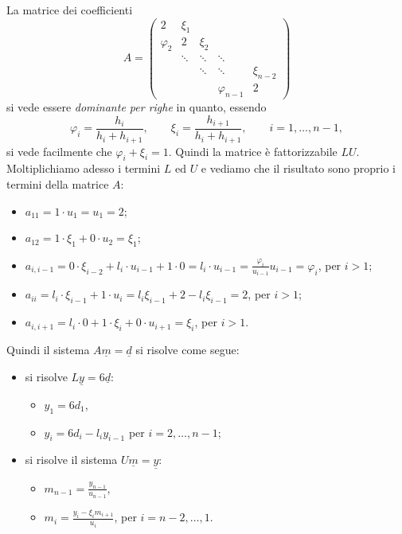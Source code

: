 \begin{sol}
	La matrice dei coefficienti
	\[
		A=\begin{pmatrix}
			2 & \xi_1 & & &\\
			\varphi_2 & 2 & \xi_2 & &\\
			& \ddots & \ddots & \ddots &\\
			& & \ddots & \ddots & \xi_{n-2}\\
			& & & \varphi_{n-1} & 2
		\end{pmatrix}
	\]
	si vede essere \textit{dominante per righe} in quanto, essendo
	$$\varphi_i=\frac{h_i}{h_i+h_{i+1}},\qquad\xi_i=\frac{h_{i+1}}{h_i+h_{i+1}},\qquad i=1,\dots,n-1,$$
	si vede facilmente che $\varphi_i+\xi_i=1$. Quindi la matrice è fattorizzabile $LU$.\\
	Moltiplichiamo adesso i termini $L$ ed $U$ e vediamo che il risultato sono proprio i termini della matrice $A$:
	\begin{itemize}
		\item $a_{11}=1\cdot u_1=u_1=2$;
		\item $a_{12}=1\cdot\xi_1 + 0\cdot u_2=\xi_1$;
		\item $a_{i,i-1}=0\cdot\xi_{i-2}+l_i\cdot u_{i-1}+1\cdot 0=l_i\cdot u_{i-1}=\frac{\varphi_i}{u_{i-1}}u_{i-1}=\varphi_i$, per $i>1$;
		\item $a_{ii}=l_i\cdot\xi_{i-1}+1\cdot u_i=l_i\xi_{i-1}+2-l_i\xi_{i-1}=2$, per $i>1$;
		\item $a_{i,i+1}=l_i\cdot 0+1\cdot\xi_i +0\cdot u_{i+1}=\xi_i$, per $i>1$.
	\end{itemize}
	Quindi il sistema $A\underline{m}=\underline{d}$ si risolve come segue:
	\begin{itemize}
		\item si risolve $L\underline{y}= 6\underline{d}$:
			\begin{itemize}
				\item $y_1=6d_1$,
				\item $y_i=6d_i-l_iy_{i-1}$ per $i=2,\dots,n-1$;
			\end{itemize}
		\item si risolve il sistema $U\underline{m}=\underline{y}$:
			\begin{itemize}
				\item $m_{n-1}=\frac{y_{n-1}}{u_{n-1}}$,
				\item $m_{i}=\frac{y_i-\xi_i m_{i+1}}{u_i}$, per $i=n-2, \dots ,1$.
			\end{itemize}
	\end{itemize}
	
\end{sol}

